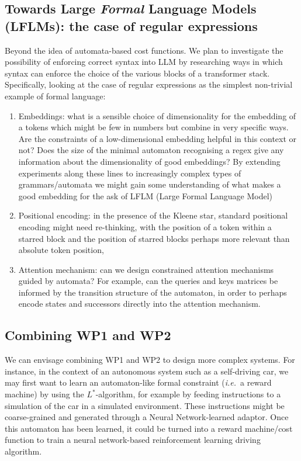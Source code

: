 \documentclass[11pt,a4paper]{article}
\newcommand{\ie}{\textit{i.e.}\ }
\newcommand{\Ls}{$L^\ast$\xspace}
\begin{document}
			
		\subsection{Towards Large \emph{Formal} Language Models (LFLMs): the case of regular expressions}
			Beyond the idea of automata-based cost functions. We plan to investigate the possibility of enforcing correct syntax into LLM by researching ways in which syntax can enforce the choice of the various blocks of a transformer stack. Specifically, looking at the case of regular expressions as the simplest non-trivial example of formal language: 
			\begin{enumerate}
				\item Embeddings: what is a sensible choice of dimensionality for the embedding of a tokens which might be few in numbers but combine in very specific ways. Are the constraints of a low-dimensional embedding helpful in this context or not? Does the size of the minimal automaton recognising a regex give any information about the dimensionality of good embeddings? By extending experiments along these lines to increasingly complex types of grammars/automata we might gain some understanding of what makes a good embedding for the ask of LFLM (Large Formal Language Model)
				\item Positional encoding:  in the presence of the Kleene star, standard positional encoding might need re-thinking, with the position of a token within a starred block and the position of starred blocks perhaps more relevant than absolute token position,
				\item Attention mechanism: can we design constrained attention mechanisms guided by automata? For example, can the queries and keys matrices be informed by the transition structure of the automaton, in order to perhaps encode states and successors directly into the attention mechanism. 		
			\end{enumerate}
		
		\subsection{Combining WP1 and WP2}
		
			We can envisage combining WP1 and WP2 to design more complex systems. For instance, in the context of an autonomous system such as a self-driving car, we may first want to learn an automaton-like formal constraint (\ie a reward machine) by using the \Ls-algorithm, for example by feeding instructions to a simulation of the car in a simulated environment. These instructions might be coarse-grained and generated through a Neural Network-learned adaptor. Once this automaton has been learned, it could be turned into a reward machine/cost function to train a neural network-based reinforcement learning driving algorithm.
	
\end{document}
